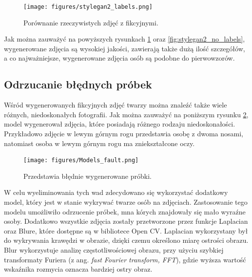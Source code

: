 \documentclass[eng,printmode]{mgr}
\begin{document}
\begin{figure}[H]
	\centering
	\texttt{[image: figures/stylegan2\_labels.png]}
	\caption{Porównanie rzeczywistych zdjęć z fikcyjnymi.}
	\label{fig:stylegan2_labels}
\end{figure}

Jak można zauważyć na powyższych rysunkach \ref{fig:stylegan2_labels} oraz \ref{fig:stylegan2_no_labels}, wygenerowane zdjęcia są wysokiej jakości, zawierają także dużą ilość szczegółów, a co najważniejsze, wygenerowane zdjęcia osób są podobne do pierwowzorów. 












\subsection{Odrzucanie błędnych próbek}

Wśród wygenerowanych fikcyjnych zdjęć twarzy można znaleźć także wiele różnych, niedoskonałych fotografii. Jak można zauważyć na poniższym rysunku \ref{fig:bledy}, model wygenerował zdjęcia, które posiadają różnego rodzaju niedoskonałości. Przykładowo zdjęcie w lewym górnym rogu przedstawia osobę z dwoma nosami, natomiast osoba w lewym górnym rogu ma zniekształcone oczy.

\begin{figure}[H]
	\centering
	\texttt{[image: figures/Models\_fault.png]}
	\caption{Przedstawia błędnie wygenerowane próbki.}
	\label{fig:bledy}
\end{figure}

W celu wyeliminowania tych wad zdecydowano się wykorzystać dodatkowy model, który jest w stanie wykrywać twarze osób na zdjęciach. Zastosowanie tego modelu umożliwiło odrzucenie próbek, mna kórych znajdowały się mało wyraźne osoby. Dodatkowo wszystkie zdjęcia zostały przetworzone przez funkcje  Laplacian oraz Blure, które dostępne są w bibliotece Open CV. Laplacian wykorzystany był do wykrywania krawędzi w obrazie, dzięki czemu określono miarę ostrości obrazu. Blur wykorzystuje analizę częstotliwościowej obrazu, przy użyciu szybkiej transformaty Furiera (z ang. \textit{fast Fourier transform, FFT}), gdzie wyższa wartość wskaźnika rozmycia oznacza bardziej ostry obraz.
\end{document}

